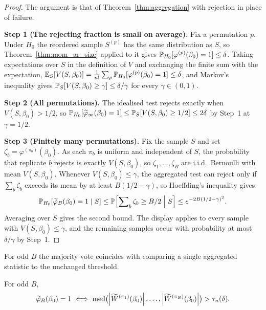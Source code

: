 \begin{proof}
    The argument is that of Theorem~\ref{thm:aggregation} with rejection in place of failure.
 
    \medskip\noindent\textbf{Step 1 (The rejecting fraction is small on average).} Fix a permutation $p$. Under $H_0$ the reordered sample $S^{(p)}$ has the same distribution as $S$, so Theorem~\ref{thm:mom_ar_size} applied to it gives $\operatorname{\mathbb{P}}_{H_0}[\varphi^{(p)}(\beta_0) = 1] \leq \delta$. Taking expectations over $S$ in the definition of $V$ and exchanging the finite sum with the expectation, $\operatorname{\mathbb{E}}_S[V(S,\beta_0)] = \frac{1}{n!}\sum_p \operatorname{\mathbb{P}}_{H_0}[\varphi^{(p)}(\beta_0) = 1] \leq \delta$, and Markov's inequality gives $\operatorname{\mathbb{P}}_S[V(S,\beta_0) \geq \gamma] \leq \delta/\gamma$ for every $\gamma \in (0,1)$.
 
    \medskip\noindent\textbf{Step 2 (All permutations).} The idealised test rejects exactly when $V(S,\beta_0) > 1/2$, so $\operatorname{\mathbb{P}}_{H_0}[\widetilde{\varphi}_\infty(\beta_0) = 1] \leq \operatorname{\mathbb{P}}_S[V(S,\beta_0) \geq 1/2] \leq 2\delta$ by Step~1 at $\gamma = 1/2$.
 
    \medskip\noindent\textbf{Step 3 (Finitely many permutations).} Fix the sample $S$ and set $\zeta_b = \varphi^{(\pi_b)}(\beta_0)$. As each $\pi_b$ is uniform and independent of $S$, the probability that replicate $b$ rejects is exactly $V(S,\beta_0)$, so $\zeta_1,\dots,\zeta_B$ are i.i.d.\ Bernoulli with mean $V(S,\beta_0)$. Whenever $V(S,\beta_0) \leq \gamma$, the aggregated test can reject only if $\sum_b \zeta_b$ exceeds its mean by at least $B(1/2-\gamma)$, so Hoeffding's inequality gives
    \[
        \operatorname{\mathbb{P}}_{H_0}\!\left[\widetilde{\varphi}_B(\beta_0) = 1 \;\middle|\; S\right]
        \leq \operatorname{\mathbb{P}}\!\left[\sum\nolimits_{b} \zeta_b \geq B/2 \;\middle|\; S\right]
        \leq e^{-2B(1/2-\gamma)^2}.
    \]
    Averaging over $S$ gives the second bound. The display applies to every sample with $V(S,\beta_0) \leq \gamma$, and the remaining samples occur with probability at most $\delta/\gamma$ by Step~1.
\end{proof}


For odd $B$ the majority vote coincides with comparing a single aggregated statistic to the unchanged threshold.

\begin{proposition}
\label{prop:agg_median_form}
    For odd $B$,
    \[
        \widetilde{\varphi}_B(\beta_0) = 1
        \iff
        \operatorname{med}\bigl(\left|\widetilde{W}^{(\pi_1)}(\beta_0)\right|,\dots,\left|\widetilde{W}^{(\pi_B)}(\beta_0)\right|\bigr) > \tau_n(\delta).
    \]
\end{proposition}
 
